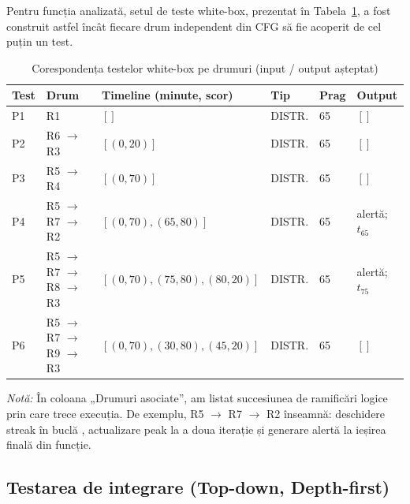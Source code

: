 Pentru funcția analizată, setul de teste white-box, prezentat în Tabela~\ref{tab:whitebox-io-compact}, a fost construit astfel încât fiecare drum independent din CFG să fie acoperit de cel puțin un test.

\begin{table}[htbp]
	\centering
	\scriptsize
	\setlength{\tabcolsep}{3pt}
	\renewcommand{\arraystretch}{1.5} %
	\caption{Corespondența testelor white-box pe drumuri (input / output așteptat)}
	\label{tab:whitebox-io-compact}
	\begin{tabularx}{\textwidth}{|l|l|>{\hsize=1.6\hsize\raggedright\arraybackslash}X|l|l|>{\hsize=0.4\hsize\raggedright\arraybackslash}X|}
		\hline
		\rowcolor[HTML]{EFEFEF}
		\textbf{Test} & \textbf{Drum} & \textbf{Timeline (minute, scor)} & \textbf{Tip} & \textbf{Prag} & \textbf{Output} \\ \hline
		
		P1 & R1 & $[]$ & DISTR. & 65 & $[]$ \\ \hline
		
		P2 & R6 $\rightarrow$ R3 & $[(0,20)]$ & DISTR. & 65 & $[]$ \\ \hline
		
		P3 & R5 $\rightarrow$ R4 & $[(0,70)]$ & DISTR. & 65 & $[]$ \\ \hline
		
		P4 & R5 $\rightarrow$ R7 $\rightarrow$ R2 & $[(0,70), (65,80)]$ & DISTR. & 65 & 1 alertă; $t_{65}$ \\ \hline
		
		P5 & R5 $\rightarrow$ R7 $\rightarrow$ R8 $\rightarrow$ R3 & $[(0,70), (75,80), (80,20)]$ & DISTR. & 65 & 1 alertă; $t_{75}$ \\ \hline
		
		P6 & R5 $\rightarrow$ R7 $\rightarrow$ R9 $\rightarrow$ R3 & $[(0,70), (30,80), (45,20)]$ & DISTR. & 65 & $[]$ \\ \hline
		
	\end{tabularx}
	
	\vspace{4pt}
	\textit{Notă:} În coloana „Drumuri asociate”, am listat succesiunea de ramificări logice prin care trece execuția. De exemplu, R5 $\rightarrow$ R7 $\rightarrow$ R2 înseamnă: deschidere streak în buclă , actualizare peak la a doua iterație și generare alertă la ieșirea finală din funcție.
\end{table}

\subsection*{Testarea de integrare (Top-down, Depth-first)}
\label{sec:testare-integrare}


